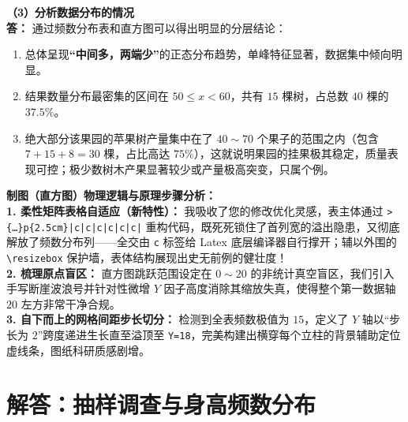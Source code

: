 \vspace{0.6cm}

\textbf{（3）分析数据分布的情况} \\
\textbf{答：} 通过频数分布表和直方图可以得出明显的分层结论：
\begin{enumerate}
    \item 总体呈现\textbf{“中间多，两端少”}的正态分布趋势，单峰特征显著，数据集中倾向明显。
    \item 结果数量分布最密集的区间在 $50 \leqslant x < 60$，共有 $15$ 棵树，占总数 $40$ 棵的 $37.5\%$。
    \item 绝大部分该果园的苹果树产量集中在了 $40 \sim 70$ 个果子的范围之内（包含 $7 + 15 + 8 = 30$ 棵，占比高达 $75\%$），这就说明果园的挂果极其稳定，质量表现可控；极少数树木产果显著较少或产量极高突变，只属个例。
\end{enumerate}

\vspace{0.6cm}

{\small\color{blue!70!black}
\textbf{制图（直方图）物理逻辑与原理步骤分析：}\\
\textbf{1. 柔性矩阵表格自适应（新特性）：} 我吸收了您的修改优化灵感，表主体通过 \texttt{>\{\dots\}p\{2.5cm\}|c|c|c|c|c|c|} 重构代码，既死死锁住了首列宽的溢出隐患，又彻底解放了频数分布列——全交由 \texttt{c} 标签给 Latex 底层编译器自行撑开；辅以外围的 \texttt{\textbackslash resizebox} 保护墙，表体结构展现出史无前例的健壮度！\\
\textbf{2. 梳理原点盲区：} 直方图跳跃范围设定在 $0 \sim 20$ 的非统计真空盲区，我们引入手写断崖波浪号并针对性微增 $Y$ 因子高度消除其缩放失真，使得整个第一数据轴 $20$ 左方非常干净合规。\\
\textbf{3. 自下而上的网格间距步长切分：} 检测到全表频数极值为 $15$，定义了 $Y$ 轴以“步长为 $2$”跨度递进生长直至溢顶至 \texttt{Y=18}，完美构建出横穿每个立柱的背景辅助定位虚线条，图纸科研质感剧增。
}

\newpage



\newpage

\section{解答：抽样调查与身高频数分布}

\vspace{0.6cm}

